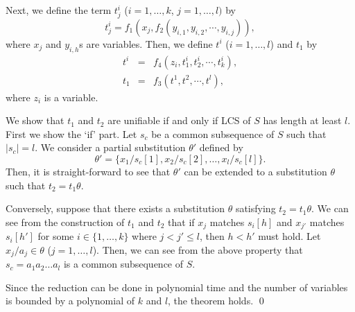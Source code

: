 \documentclass[a4paper]{llncs}
\begin{document}
Next, we define the term $t^i_j$ ($i=1,\ldots,k$, $j=1,\ldots,l)$ by
\[
t^i_j = f_1(x_j,f_2(y_{i,1},y_{i,2},\cdots,y_{i,j})),
\]
where $x_j$ and $y_{i,h}$s are variables.
Then, we define $t^i$ ($i=1,\ldots,l$) and $t_1$ by
\begin{eqnarray*}
t^i & = & f_4(z_i,t^i_1,t^i_2,\cdots,t^i_k),\\
t_1 & = & f_3(t^1,t^2,\cdots,t^l),
\end{eqnarray*}
where $z_i$ is a variable.

We show that $t_1$ and $t_2$ are unifiable if and only if
LCS of $S$ has length at least $l$.
First we show the `if' part.
Let $s_c$ be a common subsequence of $S$ such that $|s_c|=l$.
We consider a partial substitution $\theta'$ defined by
\[
\theta' = \{x_1/s_c[1],x_2/s_c[2],\ldots,x_l/s_c[l]\}.
\]
Then, it is straight-forward to see
that $\theta'$ can be extended to a substitution $\theta$ such
that $t_2 = t_1 \theta$.

Conversely, suppose that there exists a substitution $\theta$ satisfying
$t_2 = t_1 \theta$.
We can see from the construction of $t_1$ and $t_2$ that
if $x_j$ matches $s_i[h]$ and $x_{j'}$ matches $s_i[h']$
for some $i \in \{1,\ldots,k\}$ where $j < j' \leq l$,
then $h < h'$ must hold.
Let $x_j/a_j \in \theta$ ($j=1,\ldots,l$).
Then, we can see from the above property that
$s_c = a_1 a_2 \ldots a_l$ is a common subsequence of $S$.

Since the reduction can be done in polynomial time and
the number of variables is bounded by a polynomial of $k$ and $l$,
the theorem holds.
\qed
\end{document}
